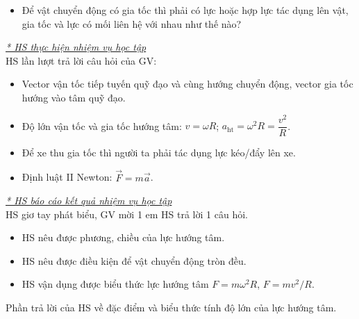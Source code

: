 {\begin{itemize}[label=$-$]
\begin{itemize}[label=$\bullet$]
\begin{center}
			\end{center}
			\item Để vật chuyển động có gia tốc thì phải có lực hoặc hợp lực tác dụng lên vật, gia tốc và lực có mối liên hệ với nhau như thế nào?
		\end{itemize}
	\end{itemize}
	\textit{\underline{* HS thực hiện nhiệm vụ học tập}}\\
	HS lần lượt trả lời câu hỏi của GV:
	\begin{itemize}
		\item Vector vận tốc tiếp tuyến quỹ đạo và cùng hướng chuyển động, vector gia tốc hướng vào tâm quỹ đạo.
		\item Độ lớn vận tốc và gia tốc hướng tâm: $v=\omega R$; $a_{\mathrm{ht}}=\omega^2R=\dfrac{v^2}{R}$.
		\item Để xe thu gia tốc thì người ta phải tác dụng lực kéo/đẩy lên xe.
		\item Định luật II Newton: $\vec{F}=m\vec{a}$.
			\end{itemize}
			\textit{\underline{* HS báo cáo kết quả nhiệm vụ học tập}}\\
			HS giơ tay phát biểu, GV mời 1 em HS trả lời 1 câu hỏi.
}
{\begin{itemize}
		\item HS nêu được phương, chiều của lực hướng tâm.
		\item HS nêu được điều kiện để vật chuyển động tròn đều.
		\item HS vận dụng được biểu thức lực hướng tâm $F=m\omega^2 R$, $F=mv^2/R$.
	\end{itemize}
}
{Phần trả lời của HS về đặc điểm và biểu thức tính độ lớn của lực hướng tâm.

}
